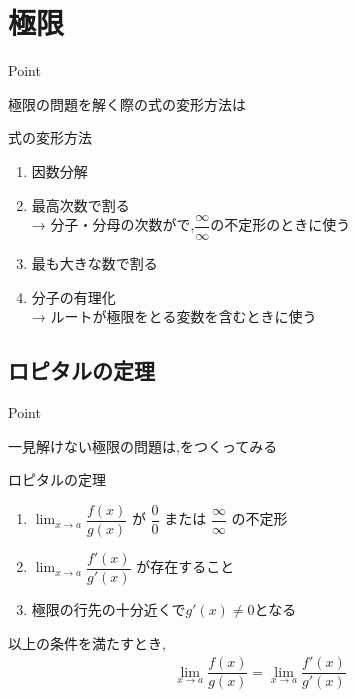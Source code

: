 \documentclass[a4paper]{jsarticle}
\begin{document}
\section{極限}
\begin{itembox}[l]{Point}
    \begin{center}
        極限の問題を解く際の式の変形方法は
    \end{center}
\end{itembox}
\begin{itembox}[l]{式の変形方法}
    \begin{enumerate}[(1)]
        \item 因数分解
        \item 最高次数で割る\\
              → 分子・分母の次数がで,$\dfrac{\infty}{\infty}$の不定形のときに使う
        \item 最も大きな数で割る
        \item 分子の有理化\\
              → ルートが極限をとる変数を含むときに使う
    \end{enumerate}
\end{itembox}
\subsection{ロピタルの定理}
\begin{itembox}[l]{Point}
    \begin{center}
        一見解けない極限の問題は,をつくってみる
    \end{center}
\end{itembox}
\begin{itembox}[l]{ロピタルの定理}
    \begin{enumerate}[(1)]
        \item $\displaystyle\lim_{x\rightarrow a}\dfrac{f\left(x\right)}{g\left(x\right)}$ が $\dfrac{0}{0}$ または $\dfrac{\infty}{\infty}$ の不定形\\
        \item $\displaystyle\lim_{x\rightarrow a}\dfrac{f'\left(x\right)}{g'\left(x\right)}$ が存在すること
        \item 極限の行先の十分近くで$g'\left(x\right)\neq 0$となる
    \end{enumerate}
    以上の条件を満たすとき,
    \begin{eqnarray*}
        \lim_{x\rightarrow a}\dfrac{f\left(x\right)}{g\left(x\right)}=\lim_{x\rightarrow a}\dfrac{f'\left(x\right)}{g'\left(x\right)}\\
    \end{eqnarray*}
\end{itembox}
\end{document}
